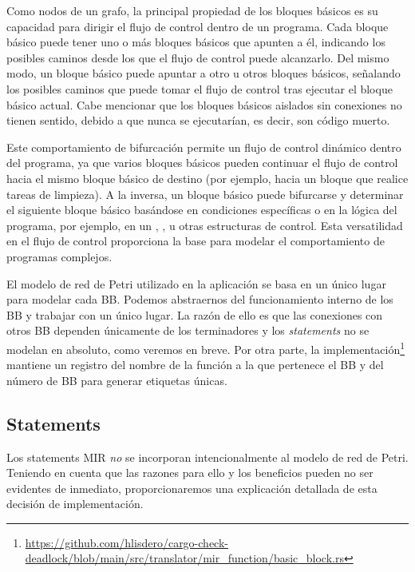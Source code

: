 Como nodos de un grafo, la principal propiedad de los bloques básicos es su capacidad para
dirigir el flujo de control dentro de un programa. Cada bloque básico puede tener uno o más
bloques básicos que apunten a él, indicando los posibles caminos desde los que el flujo de
control puede alcanzarlo. Del mismo modo, un bloque básico puede apuntar a otro u otros
bloques básicos, señalando los posibles caminos que puede tomar el flujo de control tras
ejecutar el bloque básico actual. Cabe mencionar que los bloques básicos aislados sin
conexiones no tienen sentido, debido a que nunca se ejecutarían, es decir, son código muerto.

Este comportamiento de bifurcación permite un flujo de control dinámico dentro del programa,
ya que varios bloques básicos pueden continuar el flujo de control hacia el mismo bloque
básico de destino (por ejemplo, hacia un bloque que realice tareas de limpieza). A la inversa,
un bloque básico puede bifurcarse y determinar el siguiente bloque básico basándose en
condiciones específicas o en la lógica del programa,
por ejemplo, en un , ,  u otras
estructuras de control. Esta versatilidad en el flujo de control proporciona la base para modelar
el comportamiento de programas complejos.

El modelo de red de Petri utilizado en la aplicación se basa en un único lugar para modelar
cada \acrshort{BB}. Podemos abstraernos del funcionamiento interno de los \acrshort{BB} y trabajar con un único
lugar. La razón de ello es que las conexiones con otros \acrshort{BB} dependen únicamente de los
terminadores y los \textit{statements} no se modelan en absoluto, como veremos en breve. Por otra parte,
la implementación\footnote{\url{https://github.com/hlisdero/cargo-check-deadlock/blob/main/src/translator/mir_function/basic_block.rs}}
mantiene un registro del nombre de la función a la que pertenece el \acrshort{BB} y del
número de \acrshort{BB} para generar etiquetas únicas.

\subsection{Statements}

Los statements \acrshort{MIR} \emph{no} se incorporan intencionalmente al modelo de red de Petri.
Teniendo en cuenta que las razones para ello y los beneficios pueden no ser evidentes de
inmediato, proporcionaremos una explicación detallada de esta decisión de implementación.

